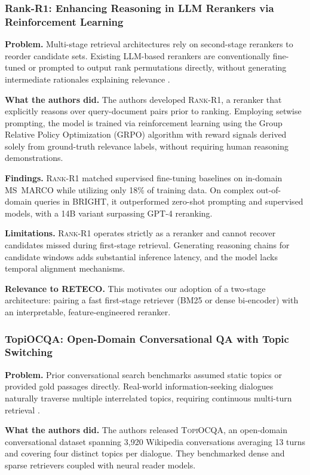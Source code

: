 \subsubsection{Rank-R1: Enhancing Reasoning in LLM Rerankers via Reinforcement Learning}
\textbf{Problem.} Multi-stage retrieval architectures rely on second-stage rerankers to reorder candidate sets. Existing LLM-based rerankers are conventionally fine-tuned or prompted to output rank permutations directly, without generating intermediate rationales explaining relevance \cite{rankr1}.

\textbf{What the authors did.} The authors developed \textsc{Rank-R1}, a reranker that explicitly reasons over query-document pairs prior to ranking. Employing setwise prompting, the model is trained via reinforcement learning using the Group Relative Policy Optimization (GRPO) algorithm with reward signals derived solely from ground-truth relevance labels, without requiring human reasoning demonstrations.

\textbf{Findings.} \textsc{Rank-R1} matched supervised fine-tuning baselines on in-domain MS~MARCO while utilizing only 18\% of training data. On complex out-of-domain queries in \textsc{BRIGHT}, it outperformed zero-shot prompting and supervised models, with a 14B variant surpassing GPT-4 reranking.

\textbf{Limitations.} \textsc{Rank-R1} operates strictly as a reranker and cannot recover candidates missed during first-stage retrieval. Generating reasoning chains for candidate windows adds substantial inference latency, and the model lacks temporal alignment mechanisms.

\textbf{Relevance to RETECO.} This motivates our adoption of a two-stage architecture: pairing a fast first-stage retriever (BM25 or dense bi-encoder) with an interpretable, feature-engineered reranker.

\subsubsection{TopiOCQA: Open-Domain Conversational QA with Topic Switching}
\textbf{Problem.} Prior conversational search benchmarks assumed static topics or provided gold passages directly. Real-world information-seeking dialogues naturally traverse multiple interrelated topics, requiring continuous multi-turn retrieval \cite{topiocqa}.

\textbf{What the authors did.} The authors released \textsc{TopiOCQA}, an open-domain conversational dataset spanning 3,920 Wikipedia conversations averaging 13 turns and covering four distinct topics per dialogue. They benchmarked dense and sparse retrievers coupled with neural reader models.

